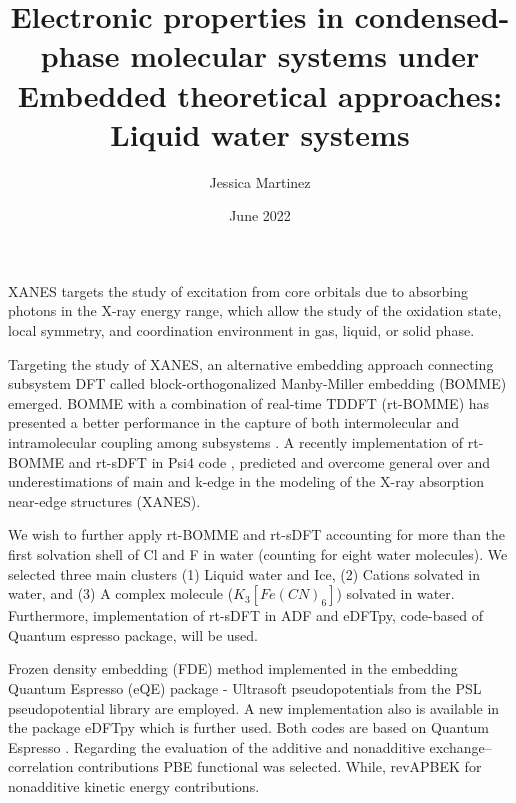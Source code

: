 \documentclass[notitlepage,12pt]{report}
\begin{document}
	\title{Electronic properties in condensed-phase molecular systems under Embedded theoretical approaches: Liquid water systems}
	\author[1]{Jessica Martinez}
	\date{June 2022}
	\renewcommand\Affilfont{\itshape\small}
	\thispagestyle{empty}
\maketitle

	XANES targets the study of excitation from core orbitals due to absorbing photons in the X-ray energy range\supercite{fransson2016x}, which allow the study of the oxidation state, local symmetry, and coordination environment in gas, liquid, or solid phase\supercite{rehr2005progress,koningsberger1987x}. 
	
	Targeting the study of XANES, an alternative embedding approach connecting subsystem DFT\supercite{mi2021eqe,mi2019nonlocal,mi2019ab} called block-orthogonalized Manby-Miller embedding (BOMME)\supercite{ding2017embedded} emerged. BOMME with a combination of real-time TDDFT (rt-BOMME) has presented a better performance in the capture of both intermolecular and intramolecular coupling among subsystems \supercite{koh2017accelerating}. A recently implementation of rt-BOMME and rt-sDFT \supercite{de2021environment} in Psi4 code \supercite{smith2020psi4}, predicted and overcome general over and underestimations of main and k-edge in the modeling of the X-ray absorption near-edge structures (XANES).
	
	We wish to further apply rt-BOMME and rt-sDFT accounting for more than the first solvation shell of Cl and F in water (counting for eight water molecules). We selected three main clusters (1) Liquid water and Ice, (2) Cations solvated in water, and (3) A complex molecule ($K_3[Fe(CN)_6]$) solvated in water. Furthermore, implementation of rt-sDFT in ADF\supercite{te2001chemistry} and eDFTpy\supercite{edftpy}, code-based of Quantum espresso package\supercite{giannozzi2009quantum}, will be used.

	Frozen density embedding (FDE) method implemented in the embedding Quantum Espresso (eQE) package \supercite{genova2017eqe}- Ultrasoft pseudopotentials from the PSL pseudopotential library \supercite{corso2014comput} are employed. A new implementation also is available in the package eDFTpy\supercite{edftpy} which is further used. Both codes are based on Quantum Espresso \supercite{qe}. Regarding the evaluation of the additive and nonadditive exchange--correlation contributions PBE functional \supercite{perdew1996phys} was selected. While, revAPBEK \supercite{laricchia2011generalized} for nonadditive kinetic energy contributions. 
\end{document}
